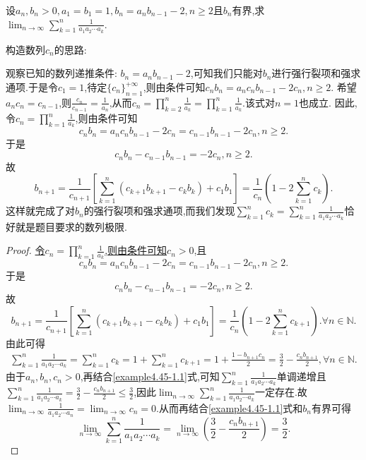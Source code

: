 \documentclass[../../main.tex]{subfiles}
\begin{document}
\begin{example}
设\(a_n,b_n>0,a_1 = b_1 = 1,b_n=a_nb_{n - 1}-2,n\geqslant 2\)且\(b_n\)有界,求\(\lim_{n\rightarrow\infty}\sum_{k = 1}^{n}\frac{1}{a_1a_2\cdots a_k}\).
\end{example}
\begin{note}
\hypertarget{example4.45构造数列的思路}{构造数列$c_n$的思路:}观察已知的数列递推条件: \(b_n = a_nb_{n - 1} - 2\),可知我们只能对\(b_n\)进行强行裂项和强求通项.于是令\(c_1 = 1\),待定\(\{ c_n \}_{n = 1}^{+\infty}\),则由条件可知\(c_nb_n = a_nc_nb_{n - 1} - 2c_n, n\geqslant  2\).
希望\(a_nc_n = c_{n - 1}\),则\(\frac{c_n}{c_{n - 1}} = \frac{1}{a_n}\),从而\(c_n = \prod_{k = 2}^n{\frac{1}{a_k}} = \prod_{k = 1}^n{\frac{1}{a_k}}\).该式对\(n = 1\)也成立.
因此,令\(c_n = \prod_{k = 1}^n{\frac{1}{a_k}}\),则由条件可知
\[
c_nb_n = a_nc_nb_{n - 1} - 2c_n = c_{n - 1}b_{n - 1} - 2c_n, n\geqslant  2.
\]
于是
\[
c_nb_n - c_{n - 1}b_{n - 1} = -2c_n, n\geqslant  2.
\]
故
\[
b_{n + 1} = \frac{1}{c_{n + 1}}\left[ \sum_{k = 1}^n{(c_{k + 1}b_{k + 1} - c_kb_k)} + c_1b_1 \right] = \frac{1}{c_n}\left( 1 - 2\sum_{k = 1}^n{c_k} \right).
\]
这样就完成了对\(b_n\)的强行裂项和强求通项,而我们发现\(\sum_{k = 1}^n{c_k} = \sum_{k = 1}^n{\frac{1}{a_1a_2\cdots a_k}}\)恰好就是题目要求的数列极限.
\end{note}
\begin{proof}
\hyperlink{example4.45构造数列的思路}{令\(c_n = \prod_{k = 1}^n{\frac{1}{a_k}}\),则由条件可知\(c_n > 0\)},且
\[
c_nb_n = a_nc_nb_{n - 1} - 2c_n = c_{n - 1}b_{n - 1} - 2c_n, n\geqslant  2.
\]
于是
\[
c_nb_n - c_{n - 1}b_{n - 1} = -2c_n, n\geqslant  2.
\]
故
\[
b_{n + 1} = \frac{1}{c_{n + 1}}\left[ \sum_{k = 1}^n{(c_{k + 1}b_{k + 1} - c_kb_k)} + c_1b_1 \right] = \frac{1}{c_n}\left( 1 - 2\sum_{k = 1}^n{c_{k + 1}} \right). \forall n\in \mathbb{N}.
\]
由此可得
\begin{align}\label{example4.45-1.1}
\sum_{k = 1}^n{\frac{1}{a_1a_2\cdots a_k}} = \sum_{k = 1}^n{c_k} = 1 + \sum_{k = 1}^n{c_{k + 1}} = 1 + \frac{1 - b_{n + 1}c_n}{2} = \frac{3}{2} - \frac{c_nb_{n + 1}}{2}, \forall n\in \mathbb{N}.  
\end{align}
由于\(a_n, b_n, c_n > 0\),再结合\eqref{example4.45-1.1}式,可知\(\sum_{k = 1}^n{\frac{1}{a_1a_2\cdots a_k}}\)单调递增且\(\sum_{k = 1}^n{\frac{1}{a_1a_2\cdots a_k}} = \frac{3}{2} - \frac{c_nb_{n + 1}}{2} \leqslant  \frac{3}{2}\),因此\(\lim_{n\rightarrow \infty} \sum_{k = 1}^n{\frac{1}{a_1a_2\cdots a_k}}\)一定存在.故\(\lim_{n\rightarrow \infty} \frac{1}{a_1a_2\cdots a_n} = \lim_{n\rightarrow \infty} c_n = 0\).从而再结合\eqref{example4.45-1.1}式和\(b_n\)有界可得
\[
\lim_{n\rightarrow \infty} \sum_{k = 1}^n{\frac{1}{a_1a_2\cdots a_k}} = \lim_{n\rightarrow \infty} \left( \frac{3}{2} - \frac{c_nb_{n + 1}}{2} \right) = \frac{3}{2}.
\]

\end{proof}
\end{document}
